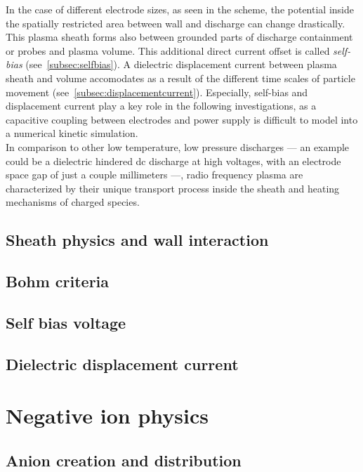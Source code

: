       In the case of different electrode sizes, as seen in the scheme, the potential inside the spatially restricted area between wall and discharge can change drastically. This plasma sheath forms also between grounded parts of discharge containment or probes and plasma volume. This additional direct current offset is called \emph{self-bias} (see~\autoref{subsec:selfbias}). A dielectric displacement current between plasma sheath and volume accomodates as a result of the different time scales of particle movement (see~\autoref{subsec:displacementcurrent}). Especially, self-bias and displacement current play a key role in the following investigations, as a capacitive coupling between electrodes and power supply is difficult to model into a numerical kinetic simulation.\\
		In comparison to other low temperature, low pressure discharges  --- an example could be a dielectric hindered dc discharge at high voltages, with an electrode space gap of just a couple millimeters ---, radio frequency plasma are characterized by their unique transport process inside the sheath and heating mechanisms of charged species. 

		\subsection{Sheath physics and wall interaction}\label{subsec:sheathphysics}

		\subsection{Bohm criteria}\label{subsec:bohmcriteria}

    \subsection{Self bias voltage}\label{subsec:selfbias}

    \subsection{Dielectric displacement current}\label{subsec:displacementcurrent}

  \section{Negative ion physics}

    \subsection{Anion creation and distribution}

